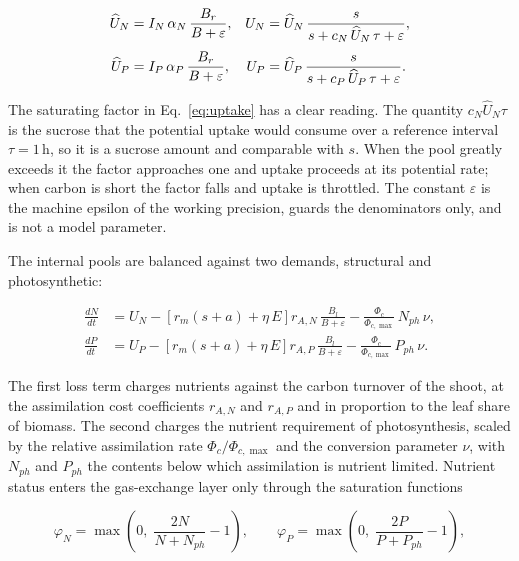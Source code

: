 \begin{align}
\widehat{U}_N &= I_N\,\alpha_N\,\frac{B_r}{B + \varepsilon},
&
U_N &= \widehat{U}_N\,
\frac{s}{s + c_N\,\widehat{U}_N\,\tau + \varepsilon},
\label{eq:uptake}\\[3pt]
\widehat{U}_P &= I_P\,\alpha_P\,\frac{B_r}{B + \varepsilon},
&
U_P &= \widehat{U}_P\,
\frac{s}{s + c_P\,\widehat{U}_P\,\tau + \varepsilon} .
\notag
\end{align}

The saturating factor in Eq.~\eqref{eq:uptake} has a clear reading. The quantity
$c_N \widehat{U}_N \tau$ is the sucrose that the potential uptake would consume
over a reference interval $\tau = 1\,\mathrm{h}$, so it is a sucrose amount and
comparable with $s$. When the pool greatly exceeds it the factor approaches one and
uptake proceeds at its potential rate; when carbon is short the factor falls and
uptake is throttled. The constant $\varepsilon$ is the machine epsilon of the
working precision, guards the denominators only, and is not a model parameter.

The internal pools are balanced against two demands, structural and
photosynthetic:

\begin{align}
\frac{dN}{dt} &= U_N
- \left[r_m\left(s+a\right) + \eta\,E\right] r_{A,N}\,\frac{B_l}{B+\varepsilon}
- \frac{\Phi_c}{\Phi_{c,\max}}\,N_{ph}\,\nu ,
\label{eq:dN}\\[3pt]
\frac{dP}{dt} &= U_P
- \left[r_m\left(s+a\right) + \eta\,E\right] r_{A,P}\,\frac{B_l}{B+\varepsilon}
- \frac{\Phi_c}{\Phi_{c,\max}}\,P_{ph}\,\nu .
\label{eq:dP}
\end{align}

The first loss term charges nutrients against the carbon turnover of the shoot, at
the assimilation cost coefficients $r_{A,N}$ and $r_{A,P}$ and in proportion to
the leaf share of biomass. The second charges the nutrient requirement of
photosynthesis, scaled by the relative assimilation rate $\Phi_c/\Phi_{c,\max}$
and the conversion parameter $\nu$, with $N_{ph}$ and $P_{ph}$ the contents below
which assimilation is nutrient limited. Nutrient status enters the gas-exchange
layer only through the saturation functions

\begin{equation}
\varphi_N = \max\!\left(0,\; \frac{2N}{N+N_{ph}} - 1\right),
\qquad
\varphi_P = \max\!\left(0,\; \frac{2P}{P+P_{ph}} - 1\right),
\label{eq:nutrient_saturation}
\end{equation}

